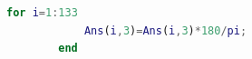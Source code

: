 \documentclass[withoutpreface,bwprint]{cumcmthesis} %
\begin{document}
\begin{appendices}
\begin{lstlisting}[language=matlab]
        for i=1:133
            Ans(i,3)=Ans(i,3)*180/pi;
        end
     \end{lstlisting}
     
\end{appendices}
\end{document}
